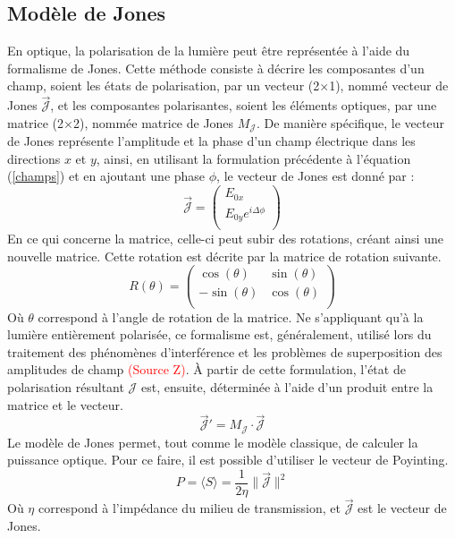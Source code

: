 \documentclass[11pt,letterpaper]{article}
\begin{document}
\subsection{Modèle de Jones}
En optique, la polarisation de la lumière peut être représentée à l'aide du formalisme de Jones. Cette méthode consiste à décrire les composantes d'un champ, soient les états de polarisation, par un vecteur (2$\times$1), nommé vecteur de Jones $\vec{\mathcal{J}}$, et les composantes polarisantes, soient les éléments optiques, par une matrice (2$\times$2), nommée matrice de Jones $M_{\mathcal{J}}$. De manière spécifique, le vecteur de Jones représente l'amplitude et la phase d'un champ électrique dans les directions $x$ et $y$, ainsi, en utilisant la formulation précédente à l'équation (\ref{champs}) et en ajoutant une phase $\phi$, le vecteur de Jones est donné par :
\begin{equation}
  \vec{\mathcal{J}}=
  \begin{pmatrix}
    E_{0x} \\
    E_{0y}e^{i\Delta\phi} \\
  \end{pmatrix}
\end{equation}
En ce qui concerne la matrice, celle-ci peut subir des rotations, créant ainsi une nouvelle matrice. Cette rotation est décrite par la matrice de rotation suivante.
\begin{equation}
  R(\theta)=
  \begin{pmatrix}
    \cos(\theta) & \sin(\theta) \\
    -\sin(\theta) & \cos(\theta) \\
  \end{pmatrix}
\end{equation}
Où $\theta$ correspond à l'angle de rotation de la matrice. Ne s'appliquant qu'à la lumière entièrement polarisée, ce formalisme est, généralement, utilisé lors du traitement des phénomènes d'interférence et les problèmes de superposition des amplitudes de champ \textcolor{red}{(Source Z)}. À partir de cette formulation, l'état de polarisation résultant $\mathcal{J}$ est, ensuite, déterminée à l'aide d'un produit entre la matrice et le vecteur.
\begin{equation}
  \vec{\mathcal{J}}'=M_{\mathcal{J}}\cdot\vec{\mathcal{J}}
\end{equation}
Le modèle de Jones permet, tout comme le modèle classique, de calculer la puissance optique. Pour ce faire, il est possible d'utiliser le vecteur de Poyinting.
\begin{equation}
  P=\langle S\rangle=\frac{1}{2\eta}\|\vec{\mathcal{J}}\|^{2}
\end{equation}
Où $\eta$ correspond à l'impédance du milieu de transmission, et $\vec{\mathcal{J}}$ est le vecteur de Jones.
\end{document}
